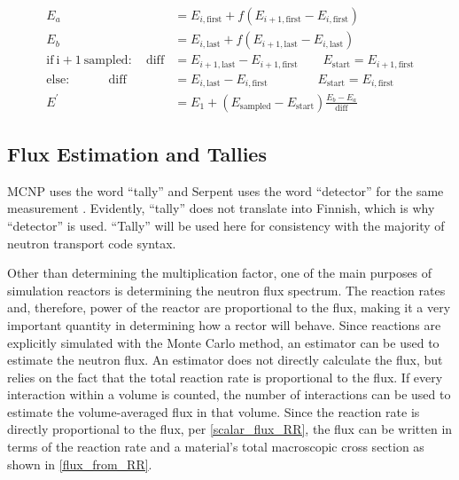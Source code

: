 \begin{equation}
\label{energy_scaling}
\begin{split}
E_a &= E_{i,\mathrm{first}} +  f( E_{i+1,\mathrm{first}} - E_{i,\mathrm{first}} ) \\
E_b &= E_{i,\mathrm{last}} +  f( E_{i+1,\mathrm{last}} - E_{i,\mathrm{last}} ) \\
\mathrm{if\:i+1\:sampled:} \quad \mathrm{diff} &= E_{i+1,\mathrm{last}}  - E_{i+1,\mathrm{first}}  \qquad E_\mathrm{start}= E_{i+1,\mathrm{first}}  \\
\mathrm{else:}          \qquad \quad       \mathrm{diff} &= E_{i,\mathrm{last}}  - E_{i,\mathrm{first}}  \qquad \qquad E_\mathrm{start}= E_{i,\mathrm{first}}  \\
E^\prime &=  E_1  +  ( E_\mathrm{sampled} - E_\mathrm{start})  \frac{ E_b - E_a}{ \mathrm{diff} }  
\end{split}
\end{equation}%


\subsection{Flux Estimation and Tallies}

MCNP uses the word ``tally'' and Serpent uses the word ``detector'' for the same measurement \cite{serpent,mcnp}.  Evidently, ``tally'' does not translate into Finnish, which is why ``detector'' is used.  ``Tally'' will be used here for consistency with the majority of neutron transport code syntax.  

Other than determining the multiplication factor, one of the main purposes of simulation reactors is determining the neutron flux spectrum.  The reaction rates and, therefore, power of the reactor are proportional to the flux, making it a very important quantity in determining how a rector will behave.  Since reactions are explicitly simulated with the  Monte Carlo method, an estimator can be used to estimate the neutron flux.  An estimator does not directly calculate the flux, but relies on the fact that the total reaction rate is proportional to the flux.  
If every interaction within a volume is counted, the number of interactions can be used to estimate the volume-averaged flux in that volume.  Since the reaction rate is directly proportional to the flux, per \eqref{scalar_flux_RR}, the flux can be written in terms of the reaction rate and a material's total macroscopic cross section as shown in \eqref{flux_from_RR}.

